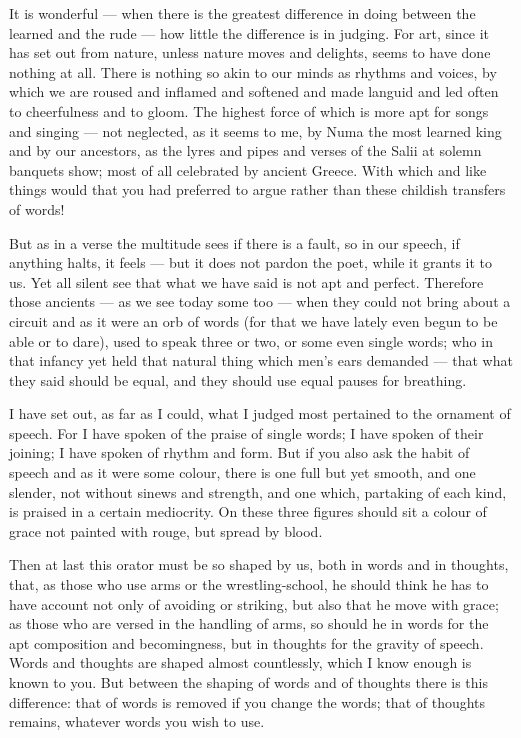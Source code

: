  It is wonderful — when there is the greatest difference in doing between the learned and the rude — how little the difference is in judging. For art, since it has set out from nature, unless nature moves and delights, seems to have done nothing at all. There is nothing so akin to our minds as rhythms and voices, by which we are roused and inflamed and softened and made languid and led often to cheerfulness and to gloom. The highest force of which is more apt for songs and singing — not neglected, as it seems to me, by Numa the most learned king and by our ancestors, as the lyres and pipes and verses of the Salii at solemn banquets show; most of all celebrated by ancient Greece. With which and like things would that you had preferred to argue rather than these childish transfers of words!

 But as in a verse the multitude sees if there is a fault, so in our speech, if anything halts, it feels — but it does not pardon the poet, while it grants it to us. Yet all silent see that what we have said is not apt and perfect. Therefore those ancients — as we see today some too — when they could not bring about a circuit and as it were an orb of words (for that we have lately even begun to be able or to dare), used to speak three or two, or some even single words; who in that infancy yet held that natural thing which men's ears demanded — that what they said should be equal, and they should use equal pauses for breathing.

 I have set out, as far as I could, what I judged most pertained to the ornament of speech. For I have spoken of the praise of single words; I have spoken of their joining; I have spoken of rhythm and form. But if you also ask the habit of speech and as it were some colour, there is one full but yet smooth, and one slender, not without sinews and strength, and one which, partaking of each kind, is praised in a certain mediocrity. On these three figures should sit a colour of grace not painted with rouge, but spread by blood.

 Then at last this orator must be so shaped by us, both in words and in thoughts, that, as those who use arms or the wrestling-school, he should think he has to have account not only of avoiding or striking, but also that he move with grace; as those who are versed in the handling of arms, so should he in words for the apt composition and becomingness, but in thoughts for the gravity of speech. Words and thoughts are shaped almost countlessly, which I know enough is known to you. But between the shaping of words and of thoughts there is this difference: that of words is removed if you change the words; that of thoughts remains, whatever words you wish to use.

